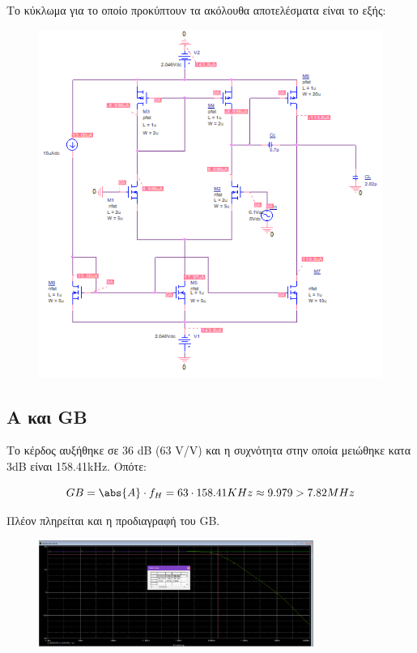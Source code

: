 \documentclass[12pt, a4paper]{article}
\begin{document}
Το κύκλωμα για το οποίο προκύπτουν τα ακόλουθα αποτελέσματα είναι το εξής:

\begin{figure}[h!]
	\centering
	\includegraphics[width = \textwidth, height = .4\textheight, keepaspectratio]{assets/circuit_tuned.png}
\end{figure}


\subsection{Α και GB}

Το κέρδος αυξήθηκε σε 36 dB (63 V/V) και η συχνότητα στην οποία μειώθηκε κατα 3dB είναι 158.41kHz. Οπότε: 

\[  GB = \abs{A} \cdot f_H = 63 \cdot 158.41KHz \approx 9.979 > 7.82 MHz \]

Πλέον πληρείται και η προδιαγραφή του GB.

\begin{figure}[h!]
	\centering
	\includegraphics[width = 0.8\textwidth, height = .3\textheight, keepaspectratio]{assets/gain_GB_tuned.png}
\end{figure}
\end{document}
